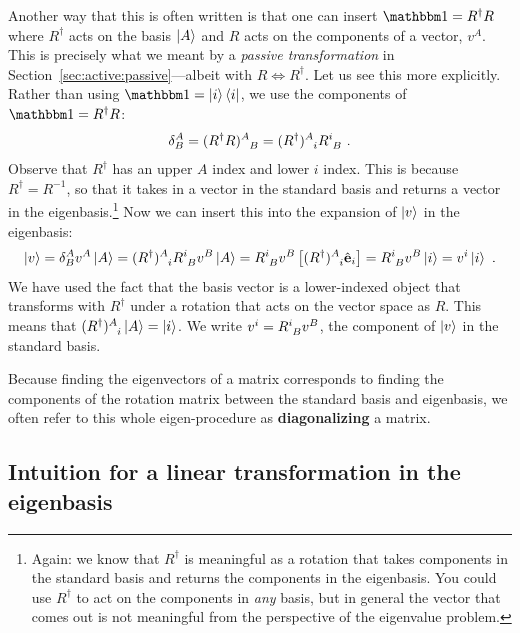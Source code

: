 \documentclass[12pt, oneside]{report}    %
\begin{document}
Another way that this is often written is that one can insert $\one = R^\dag R$ where $R^\dag$ acts on the basis $\left|A\right\rangle$ and $R$ acts on the components of a vector, $v^A$. This is precisely what we meant by a \emph{passive transformation} in Section~\ref{sec:active:passive}---albeit with $R\Leftrightarrow R^\dag$. Let us see this more explicitly. Rather than using $\one = \ket{i}\bra{i}$, we use the components of $\one = R^\dag R$:
\begin{align}
    \delta^A_B = (R^\dag R)\aij{A}{B} = 
    (R^\dag)\aij{A}{i}R\aij{i}{B} \ .
\end{align}
Observe that $R^\dag$ has an upper $A$ index and lower $i$ index. This is because $R^\dag = R^{-1}$, so that it takes in a vector in the standard basis and returns a vector in the eigenbasis.\footnote{Again: we know that $R^\dag$ is meaningful as a rotation that takes components in the standard basis and returns the components in the eigenbasis. You could use $R^\dag$ to act on the components in \emph{any} basis, but in general the vector that comes out is not meaningful from the perspective of the eigenvalue problem.} Now we can insert this into the expansion of $\left|v\right\rangle$ in the eigenbasis:
\begin{align}
    \ket{v} = \delta^A_B v^A\ket{A} 
    = (R^\dag)\aij{A}{i} R\aij{i}{B} v^B \ket{A}
    = R\aij{i}B{v}^B \left[(R^\dag)\aij{A}{i}\bas{e}_i\right]
    = R\aij{i}B{v}^B \ket{i}
    = v^i \ket{i}  \ .
\end{align}
We have used the fact that the basis vector is a lower-indexed object that transforms with $R^\dag$ under a rotation that acts on the vector space as $R$. This means that $(R^\dag)\aij{A}{i}\ket{A} = \ket{i}$. We write $v^i = R\aij{i}{B} v^B$, the component of $\left|v\right\rangle$ in the standard basis. 


\begin{bigidea}
Because finding the eigenvectors of a matrix corresponds to finding the components of the rotation matrix between the standard basis and eigenbasis, we often refer to this whole eigen-procedure as \textbf{diagonalizing} a matrix.
\end{bigidea}



\subsection{Intuition for a linear transformation in the eigenbasis}
\end{document}
